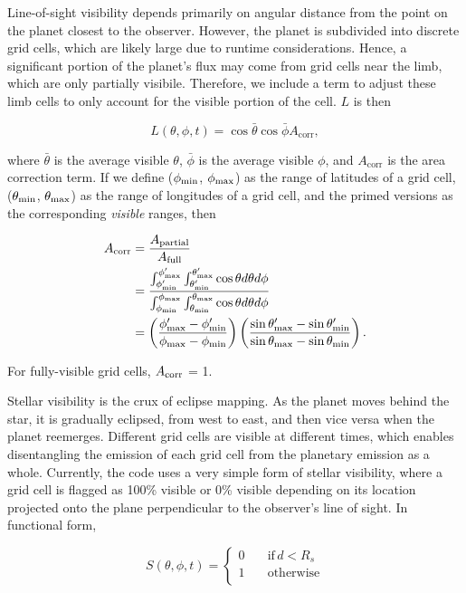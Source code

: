 \documentclass[12pt]{article}
\newcommand{\phimin}{\phi_{\rm min}}
\newcommand{\phimax}{\phi_{\rm max}}
\newcommand{\thetamin}{\theta_{\rm min}}
\newcommand{\thetamax}{\theta_{\rm max}}
\newcommand{\phiminp}{\phi_{\rm min}^\prime}
\newcommand{\phimaxp}{\phi_{\rm max}^\prime}
\newcommand{\thetaminp}{\theta_{\rm min}^\prime}
\newcommand{\thetamaxp}{\theta_{\rm max}^\prime}
\begin{document}
Line-of-sight visibility depends primarily on angular distance from
the point on the planet closest to the observer. However, the planet is
subdivided into discrete grid cells, which are likely large due
to runtime considerations. Hence, a significant portion of the planet's
flux may come from grid cells near the limb, which are only
partially visibile. Therefore, we include a term to adjust these limb
cells to only account for the visible portion of the cell. $L$ is
then

\begin{equation}
  L(\theta, \phi, t) = \cos\bar\theta \cos\bar\phi A_{\textrm{corr}},
\end{equation}

\noindent
where $\bar\theta$ is the average visible $\theta$, $\bar\phi$ is the
average visible $\phi$, and $A_{\textrm{corr}}$ is the area correction
term. If we define ($\phi_{\rm min}$, $\phi_{\rm max}$) as the range
of latitudes of a grid cell, ($\theta_{\rm min}$, $\theta_{\rm max}$)
as the range of longitudes of a grid cell, and the primed versions as
the corresponding \textit{visible} ranges, then

\begin{align}
  A_{\textrm{corr}} &= \frac{A_{\textrm{partial}}}{A_{\textrm{full}}}\\
  &= \frac{\int_{\phiminp}^{\phimaxp}\int_{\thetaminp}^{\thetamaxp}\cos\theta d\theta d\phi}{\int_{\phimin}^{\phimax}\int_{\thetamin}^{\thetamax}\cos\theta d\theta d\phi}\\
  &= \left(\frac{\phimaxp - \phiminp}{\phimax - \phimin}\right)\left(\frac{\sin\thetamaxp - \sin\thetaminp}{\sin\thetamax - \sin\thetamin}\right).
\end{align}

\noindent
For fully-visible grid cells, $A_{\rm corr}$ = 1.

Stellar visibility is the crux of eclipse mapping. As the planet moves
behind the star, it is gradually eclipsed, from west to east, and then
vice versa when the planet reemerges. Different grid cells are visible
at different times, which enables disentangling the emission of each
grid cell from the planetary emission as a whole. Currently, the
code uses a very simple form of stellar visibility, where a grid cell
is flagged as 100\% visible or 0\% visible depending on its location
projected onto the plane perpendicular to the observer's line
of sight. In functional form,

\begin{equation*}
  S(\theta, \phi, t)=\begin{cases}
    0 \quad &\text{if}\, d < R_s \\
    1 \quad &\text{otherwise} \\
  \end{cases}
\end{equation*}
\end{document}
